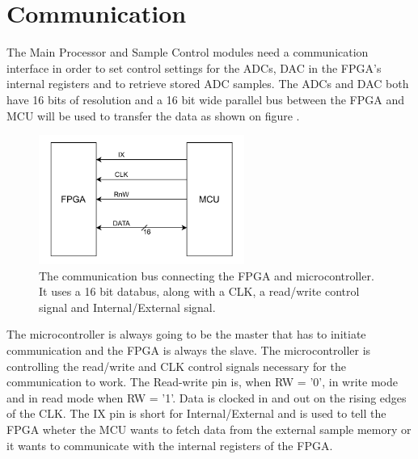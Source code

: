 \section{Communication} \label{subsec:Communication}
The Main Processor and Sample Control modules need a communication interface in order to set control settings for the ADCs, DAC in the FPGA's internal registers and to retrieve stored ADC samples. The ADCs and DAC  both have 16 bits of resolution and a 16 bit wide parallel bus between the FPGA and MCU will be used to transfer the data as shown on figure .

\begin{figure}[H]
    \centering
    \includegraphics[clip, trim=0 0 0 0, width=0.6\textwidth]{Sections/7_SystemDesign/Figures/CommPort_Block.pdf}
    \caption{The communication bus connecting the FPGA and microcontroller. It uses a 16 bit databus, along with a CLK, a read/write control signal and Internal/External signal.}
    \label{fig_7_2_1_CommBus}
\end{figure}

The microcontroller is always going to be the master that has to initiate communication and the FPGA is always the slave. The microcontroller is controlling the read/write and CLK control signals necessary for the communication to work. The Read-write pin is, when  RW = '0', in write mode and in read mode when RW = '1'. Data is clocked in and out on the rising edges of the CLK. The IX pin is short for Internal/External and is used to tell the FPGA wheter the MCU wants to fetch data from the external sample memory or it wants to communicate with the internal registers of the FPGA. 

